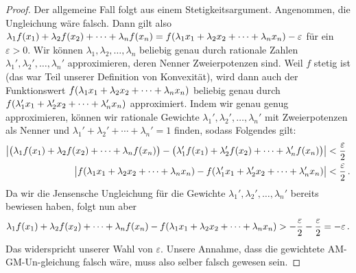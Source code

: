 \begin{proof}
	Der allgemeine Fall folgt aus einem Stetigkeitsargument. Angenommen, die Ungleichung wäre falsch. Dann gilt also $\lambda_1f(x_1)+\lambda_2f(x_2)+\dotsb+\lambda_nf(x_n)= f\parens*{\lambda_1x_1+\lambda_2 x_2+\dotsb+\lambda_nx_n}-\varepsilon$ für ein $\varepsilon>0$. Wir können $\lambda_1,\lambda_2,\dotsc,\lambda_n$ beliebig genau durch rationale Zahlen $\lambda_1',\lambda_2',\dotsc,\lambda_n'$ approximieren, deren Nenner Zweierpotenzen sind. Weil $f$ stetig ist (das war Teil unserer Definition von Konvexität), wird dann auch der Funktionswert $f\parens*{\lambda_1x_1+\lambda_2 x_2+\dotsb+\lambda_nx_n}$ beliebig genau durch $f\parens*{\lambda_1'x_1+\lambda_2' x_2+\dotsb+\lambda_n'x_n}$ approximiert. Indem wir genau genug approximieren, können wir rationale Gewichte $\lambda_1',\lambda_2',\dotsc,\lambda_n'$ mit Zweierpotenzen als Nenner und $\lambda_1'+\lambda_2'+\dotsb+\lambda_n'=1$ finden, sodass Folgendes gilt:
	\begin{align*}
		\abs[\big]{\parens[\big]{\lambda_1 f(x_1)+\lambda_2 f(x_2)+\dotsb+\lambda_nf(x_n)}-\parens[\big]{\lambda_1' f(x_1)+\lambda_2' f(x_2)+\dotsb+\lambda_n'f(x_n)}}&<\frac{\varepsilon}{2}\\
		\abs[\big]{f\parens*{\lambda_1x_1+\lambda_2 x_2+\dotsb+\lambda_nx_n}-f\parens*{\lambda_1'x_1+\lambda_2' x_2+\dotsb+\lambda_n'x_n}}&<\frac{\varepsilon}{2}\,.
	\end{align*}
	Da wir die Jensensche Ungleichung für die Gewichte $\lambda_1',\lambda_2',\dotsc,\lambda_n'$ bereits bewiesen haben, folgt nun aber
	\begin{equation*}
		\lambda_1 f(x_1)+\lambda_2 	f(x_2)+\dotsb+\lambda_nf(x_n)-f\parens*{\lambda_1x_1+\lambda_2 x_2+\dotsb+\lambda_nx_n}>-\frac{\varepsilon}2-\frac{\varepsilon}2=-\varepsilon\,.
	\end{equation*}
	Das widerspricht unserer Wahl von $\varepsilon$. Unsere Annahme, dass die gewichtete AM-GM-Un-gleichung falsch wäre, muss also selber falsch gewesen sein.
\end{proof}

